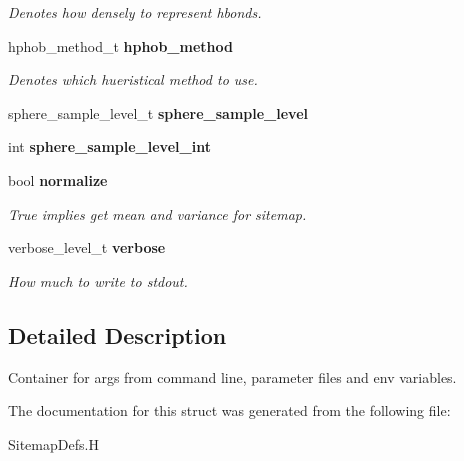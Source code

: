 \begin{CompactItemize}
\begin{CompactList}\small\item\em Denotes how densely to represent hbonds. \item\end{CompactList}\item 
hphob\_\-method\_\-t \bf{hphob\_\-method}\label{structSimSite3D_1_1sitemap__variables__t_2a80a7d61e4e7b4062d4f7add6a5fb06}

\begin{CompactList}\small\item\em Denotes which hueristical method to use. \item\end{CompactList}\item 
sphere\_\-sample\_\-level\_\-t \textbf{sphere\_\-sample\_\-level}\label{structSimSite3D_1_1sitemap__variables__t_a45236ac5b594ec4cefad791b4f152b1}

\item 
int \textbf{sphere\_\-sample\_\-level\_\-int}\label{structSimSite3D_1_1sitemap__variables__t_d2fb2b8ce3b46216370b6006d8e757aa}

\item 
bool \bf{normalize}\label{structSimSite3D_1_1sitemap__variables__t_74cbcaa59bfae447d25c367ca3eab643}

\begin{CompactList}\small\item\em True implies get mean and variance for sitemap. \item\end{CompactList}\item 
verbose\_\-level\_\-t \bf{verbose}\label{structSimSite3D_1_1sitemap__variables__t_f9d61423254f0b0be183097564d60d2f}

\begin{CompactList}\small\item\em How much to write to stdout. \item\end{CompactList}\end{CompactItemize}


\subsection{Detailed Description}
Container for args from command line, parameter files and env variables. 



The documentation for this struct was generated from the following file:\begin{CompactItemize}
\item 
Sitemap\-Defs.H\end{CompactItemize}
